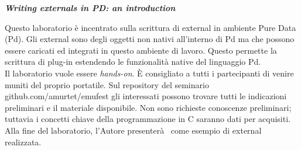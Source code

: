 \begin{flushleft}
\textbf{\emph{Writing externals in PD: an introduction}}

Questo laboratorio \`e incentrato sulla scrittura di external in ambiente Pure Data (Pd). Gli external sono degli oggetti non nativi all'interno di Pd ma che possono essere caricati ed integrati in questo ambiente di lavoro. Questo permette la scrittura di plug-in estendendo le funzionalit\`a native del linguaggio Pd. \\
Il laboratorio vuole essere \emph{hands-on}. \`E consigliato a tutti i partecipanti di venire muniti del proprio portatile. Sul repository del seminario github.com/amurtet/emufest gli interessati possono trovare tutti le indicazioni preliminari e il materiale disponibile. Non sono richieste conoscenze preliminari; tuttavia i concetti chiave della programmazione in C saranno dati per acquisiti. \\
Alla fine del laboratorio, l'Autore presenter\`a \pa ~come esempio di external realizzata. \\

\end{flushleft}
